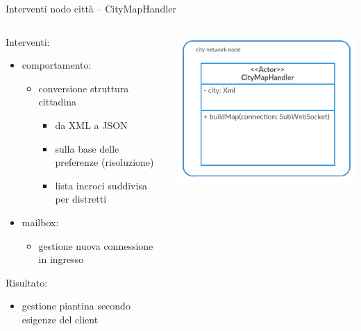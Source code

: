 \begin{frame}{Interventi nodo città -- \scriptsize{CityMapHandler}}
	\begin{columns}
		\begin{column}{0.7\textwidth}
		Interventi:
		\begin{itemize}
			\item{\footnotesize{comportamento:}}
			\begin{itemize}
				\item{\scriptsize{conversione struttura cittadina}}
				\begin{itemize}
					\item{\tiny{da XML a JSON}}
					\item{\tiny{sulla base delle preferenze (risoluzione)}}
					\item{\tiny{lista incroci suddivisa per distretti}}
				\end{itemize}
			\end{itemize}
			\item{\footnotesize{mailbox}}:
			\begin{itemize}
				\item{\scriptsize{gestione nuova connessione in ingresso}}
			\end{itemize}
		\end{itemize}
		Risultato:
		\begin{itemize}
			\item{\footnotesize{gestione piantina secondo esigenze del client}}
		\end{itemize}
		\end{column}
		\begin{column}{0.3\textwidth}
			\centering
			\includegraphics[scale=0.3]{images/cityMapHandler.png}
		\end{column}
	\end{columns}
\end{frame}

